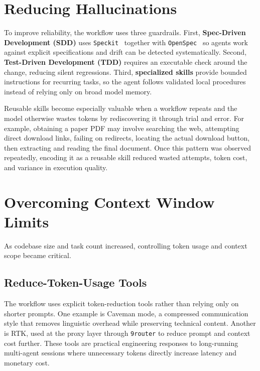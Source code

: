 \section{Reducing Hallucinations}\label{reducing-hallucinations}

To improve reliability, the workflow uses three guardrails. First, \textbf{Spec-Driven Development (SDD)} uses \texttt{Speckit}~\cite{speckit} together with \texttt{OpenSpec}~\cite{openspec} so agents work against explicit specifications and drift can be detected systematically. Second, \textbf{Test-Driven Development (TDD)} requires an executable check around the change, reducing silent regressions. Third, \textbf{specialized skills} provide bounded instructions for recurring tasks, so the agent follows validated local procedures instead of relying only on broad model memory.

Reusable skills become especially valuable when a workflow repeats and the model otherwise wastes tokens by rediscovering it through trial and error. For example, obtaining a paper PDF may involve searching the web, attempting direct download links, failing on redirects, locating the actual download button, then extracting and reading the final document. Once this pattern was observed repeatedly, encoding it as a reusable skill reduced wasted attempts, token cost, and variance in execution quality.
\section{Overcoming Context Window Limits}\label{overcoming-context-window-limits}

As codebase size and task count increased, controlling token usage and context scope became critical.

\subsection{Reduce-Token-Usage Tools}\label{reduce-token-usage-tools}

The workflow uses explicit token-reduction tools rather than relying only on shorter prompts. One example is Caveman mode, a compressed communication style that removes linguistic overhead while preserving technical content. Another is RTK, used at the proxy layer through \texttt{9router} to reduce prompt and context cost further. These tools are practical engineering responses to long-running multi-agent sessions where unnecessary tokens directly increase latency and monetary cost.

